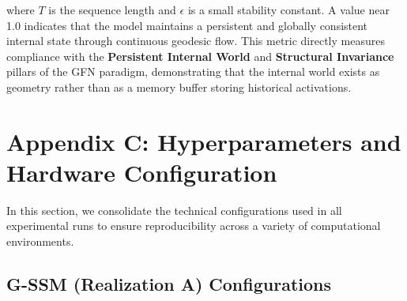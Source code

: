 \documentclass[12pt,a4paper]{article}
\begin{document}
where $T$ is the sequence length and $\epsilon$ is a small stability constant. A value near 1.0 indicates that the model maintains a persistent and globally consistent internal state through continuous geodesic flow. This metric directly measures compliance with the \textbf{Persistent Internal World} and \textbf{Structural Invariance} pillars of the GFN paradigm, demonstrating that the internal world exists as geometry rather than as a memory buffer storing historical activations.


\section{Appendix C: Hyperparameters and Hardware Configuration}
\label{sec:appendix-hyperparams}

In this section, we consolidate the technical configurations used in all experimental runs to ensure reproducibility across a variety of computational environments.

\subsection{G-SSM (Realization A) Configurations}
\end{document}
